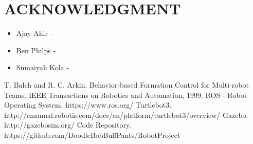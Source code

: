\documentclass[letterpaper, 10 pt, conference]{ieeeconf}  %
\begin{document}

\section{ACKNOWLEDGMENT}

\begin{itemize}
\item Ajay Ahir - 
\item Ben Philps - 
\item Sumaiyah Kola - 
\end{itemize}


\begin{thebibliography}{99}

 T. Balch and R. C. Arkin. Behavior-based Formation Control for Multi-robot Teams. IEEE Transactions on Robotics and Automation, 1999.
 ROS - Robot Operating System. https://www.ros.org/
 Turtlebot3. http://emanual.robotis.com/docs/en/platform/turtlebot3/overview/
 Gazebo. http://gazebosim.org/
 Code Repository. https://github.com/DoodleBobBuffPants/RobotProject

\end{thebibliography}
\end{document}
